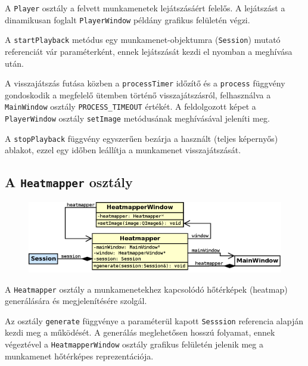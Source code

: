 A \texttt{Player} osztály a felvett munkamenetek lejátszásáért felelős. A lejátszást a dinamikusan foglalt \texttt{PlayerWindow} példány grafikus felületén végzi.

A \texttt{startPlayback} metódus egy munkamenet-objektumra (\texttt{Session}) mutató referenciát vár paraméterként, ennek lejátszását kezdi el nyomban a meghívása után.

A visszajátszás futása közben a \texttt{processTimer} időzítő és a \texttt{process} függvény gondoskodik a megfelelő ütemben történő visszajátszásról, felhasználva a \texttt{MainWindow} osztály \texttt{PROCESS\_TIMEOUT} értékét. A feldolgozott képet a \texttt{PlayerWindow} osztály \texttt{setImage} metódusának meghívásával jeleníti meg.

A \texttt{stopPlayback} függvény egyszerűen bezárja a használt (teljes képernyős) ablakot, ezzel egy időben leállítja a munkamenet visszajátszását.

\subsection{A \texttt{Heatmapper} osztály}\label{sect:heatmapper}

\begin{figure}[!ht]
\centering
\includegraphics[width=140mm, keepaspectratio]{figures/class_heatmapper.png}
\end{figure}

A \texttt{Heatmapper} osztály a munkamenetekhez kapcsolódó hőtérképek (heatmap) generálására és megjelenítésére szolgál.

Az osztály \texttt{generate} függvénye a paraméterül kapott \texttt{Sesssion} referencia alapján kezdi meg a működését. A generálás meglehetősen hosszú folyamat, ennek végeztével a \texttt{HeatmapperWindow} osztály grafikus felületén jelenik meg a munkamenet hőtérképes reprezentációja.

